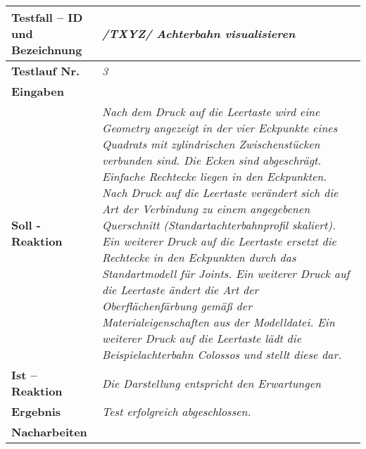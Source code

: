 \begin{longtable}{|p{7cm}|p{10cm}|}
\hline
\textbf{Testfall -- ID und Bezeichnung} & \textit{ /TXYZ/ Achterbahn visualisieren} \\
\hline
\textbf{Testlauf Nr.} & \textit{3} \\
\hline
\textbf{Eingaben} & \textit{} \\
\hline
\textbf{Soll - Reaktion} & \textit{Nach dem Druck auf die Leertaste wird eine Geometry angezeigt in der vier Eckpunkte eines Quadrats mit zylindrischen Zwischenstücken verbunden sind. Die Ecken sind abgeschrägt. Einfache Rechtecke liegen in den Eckpunkten.
Nach Druck auf die Leertaste verändert sich die Art der Verbindung zu einem angegebenen Querschnitt (Standartachterbahnprofil skaliert). Ein weiterer Druck auf die Leertaste ersetzt die Rechtecke in den Eckpunkten durch 
das Standartmodell für Joints. Ein weiterer Druck auf die Leertaste ändert die Art der Oberflächenfärbung gemäß der Materialeigenschaften aus der Modelldatei. Ein weiterer Druck auf die Leertaste lädt die Beispielachterbahn Colossos und stellt diese dar.
} \\
\hline
\textbf{Ist -- Reaktion} & \textit{Die Darstellung entspricht den Erwartungen} \\
\hline
\textbf{Ergebnis} & \textit{Test erfolgreich abgeschlossen.} \\
\hline
\textbf{Nacharbeiten } & \textit{} \\
\hline
 \end{longtable}

